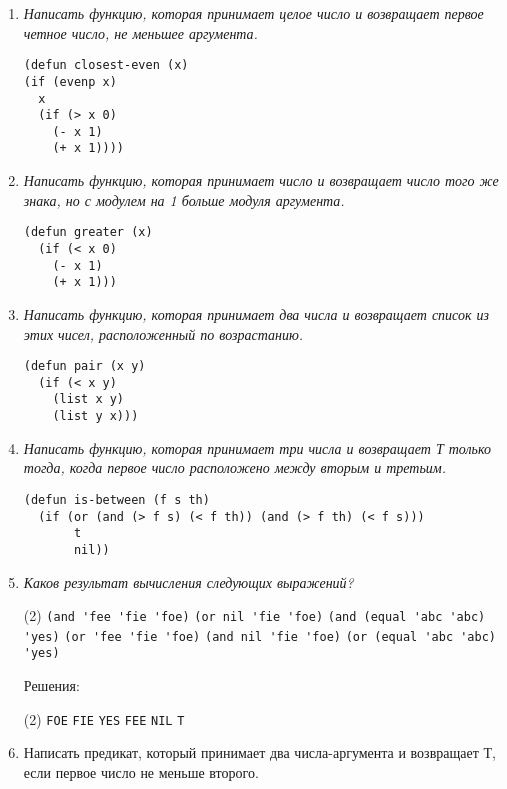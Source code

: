 \begin{enumerate}[wide=0pt]
\item \textit{Написать функцию, которая принимает целое число и возвращает первое
четное число, не меньшее аргумента.}
\begin{lstlisting}
(defun closest-even (x) 
(if (evenp x)
  x
  (if (> x 0)
    (- x 1)
    (+ x 1))))
\end{lstlisting}

\item \textit{Написать функцию, которая принимает число и возвращает число
того же знака, но с модулем на 1 больше модуля аргумента.}
\begin{lstlisting}
(defun greater (x) 
  (if (< x 0)
    (- x 1)
    (+ x 1)))
\end{lstlisting}
\item \textit{Написать функцию, которая принимает два числа и возвращает
список из этих чисел, расположенный по возрастанию.}
\begin{lstlisting}
(defun pair (x y)
  (if (< x y)
    (list x y)
    (list y x)))
\end{lstlisting}
\item \textit{Написать функцию, которая принимает три числа и возвращает Т только
тогда, когда первое число расположено между вторым и третьим.}
\begin{lstlisting}
(defun is-between (f s th)
  (if (or (and (> f s) (< f th)) (and (> f th) (< f s)))
       t
       nil))
\end{lstlisting}
\item\textit{ Каков результат вычисления следующих выражений?}
\begin{tasks}[label=\arabic*), item-indent=3pt, after-item-skip=1pt](2)
	\task \lstinline|(and 'fee 'fie 'foe)|
	\task \lstinline|(or nil 'fie 'foe)|
	\task \lstinline|(and (equal 'abc 'abc) 'yes)|
	\task \lstinline|(or 'fee 'fie 'foe)|
	\task \lstinline|(and nil 'fie 'foe)|
	\task \lstinline|(or (equal 'abc 'abc) 'yes)|
\end{tasks}
Решения:
\begin{tasks}[label=\arabic*), item-indent=3pt, after-item-skip=1pt](2)
	\task \lstinline|FOE|
	\task \lstinline|FIE|
	\task \lstinline|YES|
	\task \lstinline|FEE|
	\task \lstinline|NIL|
	\task \lstinline|T|
\end{tasks}
\item {Написать предикат, который принимает два числа-аргумента и возвращает Т, если первое число не меньше второго.}
\begin{lstlisting}

\end{lstlisting}
\end{enumerate}
